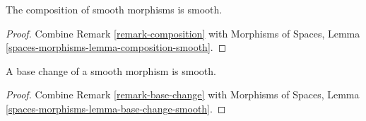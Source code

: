 \begin{lemma}
\label{lemma-composition-smooth}
The composition of smooth morphisms is smooth.
\end{lemma}

\begin{proof}
Combine
Remark \ref{remark-composition}
with
Morphisms of Spaces, Lemma
\ref{spaces-morphisms-lemma-composition-smooth}.
\end{proof}

\begin{lemma}
\label{lemma-base-change-smooth}
A base change of a smooth morphism is smooth.
\end{lemma}

\begin{proof}
Combine
Remark \ref{remark-base-change}
with
Morphisms of Spaces, Lemma
\ref{spaces-morphisms-lemma-base-change-smooth}.
\end{proof}














